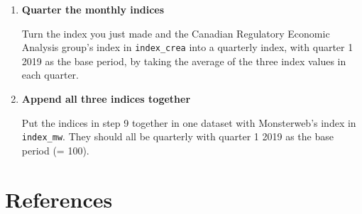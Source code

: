 \documentclass[]{article}
\newenvironment{Shaded}{\begin{snugshade}}{\end{snugshade}}
\newcommand{\CommentTok}[1]{\textcolor[rgb]{0.56,0.35,0.01}{\textit{#1}}}
\newcommand{\DataTypeTok}[1]{\textcolor[rgb]{0.13,0.29,0.53}{#1}}
\newcommand{\DecValTok}[1]{\textcolor[rgb]{0.00,0.00,0.81}{#1}}
\newcommand{\KeywordTok}[1]{\textcolor[rgb]{0.13,0.29,0.53}{\textbf{#1}}}
\newcommand{\NormalTok}[1]{#1}
\newcommand{\OperatorTok}[1]{\textcolor[rgb]{0.81,0.36,0.00}{\textbf{#1}}}
\newcommand{\StringTok}[1]{\textcolor[rgb]{0.31,0.60,0.02}{#1}}
\begin{document}
\begin{enumerate}
\def\labelenumi{\arabic{enumi}.}
\setcounter{enumi}{8}
\item
  \textbf{Quarter the monthly indices}

  Turn the index you just made and the Canadian Regulatory Economic Analysis group's index in \texttt{index\_crea} into a quarterly index, with quarter 1 2019 as the base period, by taking the average of the three index values in each quarter.

\begin{Shaded}
\end{Shaded}
\item
  \textbf{Append all three indices together}

  Put the indices in step 9 together in one dataset with Monsterweb's index in \texttt{index\_mw}. They should all be quarterly with quarter 1 2019 as the base period (= 100).
\end{enumerate}

\hypertarget{references}{%
\section*{References}\label{references}}
\end{document}
